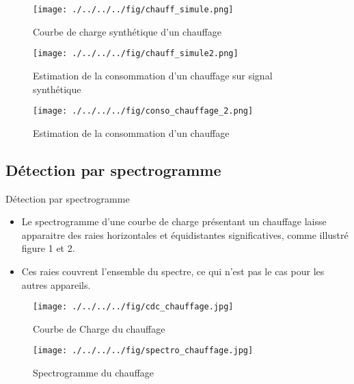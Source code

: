 \documentclass{beamer}
\begin{document}
\begin{frame}
\begin{figure}[!h]
\begin{center}
\texttt{[image: ./../../../fig/chauff\_simule.png]}
\caption{Courbe de charge synthétique d'un chauffage}
\label{Figure3}
\end{center}
\end{figure}
\end{frame}

\begin{frame}
\begin{figure}[!h]
\begin{center}
\texttt{[image: ./../../../fig/chauff\_simule2.png]}
\caption{Estimation de la consommation d'un chauffage sur signal synthétique}
\label{Figure4}
\end{center}
\end{figure}
\end{frame}

\begin{frame}
\begin{figure}[!h]
\begin{center}
\texttt{[image: ./../../../fig/conso\_chauffage\_2.png]}
\caption{Estimation de la consommation d'un chauffage}
\label{Figure5}
\end{center}
\end{figure}
\end{frame}

\subsection{Détection par spectrogramme}

\begin{frame}{Détection par spectrogramme}
\begin{itemize}
	\item Le spectrogramme d'une courbe de charge présentant un chauffage laisse apparaitre des raies horizontales et équidistantes significatives, comme illustré figure 1 et 2.
	\item Ces raies couvrent l'ensemble du spectre, ce qui n'est pas le cas pour les autres appareils.
\end{itemize}
\end{frame}

\begin{frame}

\begin{figure}[!h]
\begin{center}
\texttt{[image: ./../../../fig/cdc\_chauffage.jpg]}
\caption{Courbe de Charge du chauffage}
\label{Figure6}
\end{center}
\end{figure}

\begin{figure}[!h]
\begin{center}
\texttt{[image: ./../../../fig/spectro\_chauffage.jpg]}
\caption{Spectrogramme du chauffage}
\label{Figure7}
\end{center}
\end{figure}

\end{frame}
\end{document}
